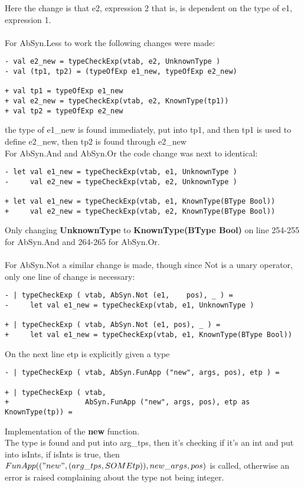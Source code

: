Here the change is that e2, expression 2 that is, is dependent on the type of
e1, expression 1.\\
\\
For AbSyn.Less to work the following changes were made:
\begin{lstlisting}[style=MLStyle]
- val e2_new = typeCheckExp(vtab, e2, UnknownType )
- val (tp1, tp2) = (typeOfExp e1_new, typeOfExp e2_new)

+ val tp1 = typeOfExp e1_new
+ val e2_new = typeCheckExp(vtab, e2, KnownType(tp1))
+ val tp2 = typeOfExp e2_new 
\end{lstlisting}
the type of e1\_new is found immediately, put into tp1, and then tp1 is used to
define e2\_new, then tp2 is found through e2\_new
\\
For AbSyn.And and AbSyn.Or the code change was next to identical:
\begin{lstlisting}[style=MLStyle]
- let val e1_new = typeCheckExp(vtab, e1, UnknownType )
-     val e2_new = typeCheckExp(vtab, e2, UnknownType )

+ let val e1_new = typeCheckExp(vtab, e1, KnownType(BType Bool))
+     val e2_new = typeCheckExp(vtab, e2, KnownType(BType Bool))
\end{lstlisting}
Only changing \textbf{UnknownType} to \textbf{KnownType(BType Bool)} on line
254-255 for AbSyn.And and 264-265 for AbSyn.Or.\\
\\
For AbSyn.Not a similar change is made, though since Not is a unary operator,
only one line of change is necessary:
\begin{lstlisting}[style=MLStyle]
- | typeCheckExp ( vtab, AbSyn.Not (e1,    pos), _ ) =
-     let val e1_new = typeCheckExp(vtab, e1, UnknownType )

+ | typeCheckExp ( vtab, AbSyn.Not (e1, pos), _ ) =
+     let val e1_new = typeCheckExp(vtab, e1, KnownType(BType Bool))
\end{lstlisting}
On the next line etp is explicitly given a type
\begin{lstlisting}[style=MLStyle]
- | typeCheckExp ( vtab, AbSyn.FunApp ("new", args, pos), etp ) =

+ | typeCheckExp ( vtab, 
+                  AbSyn.FunApp ("new", args, pos), etp as KnownType(tp)) =
\end{lstlisting}
Implementation of the \textbf{new} function.\\
The type is found and put into arg\_tps, then it's checking if it's an int and
put into isInts, if isInts is true, then \emph{$FunApp(("new", (arg\_tps, SOME
tp)), new\_args, pos)$} is called, otherwise an error is raised complaining about
the type not being integer.

